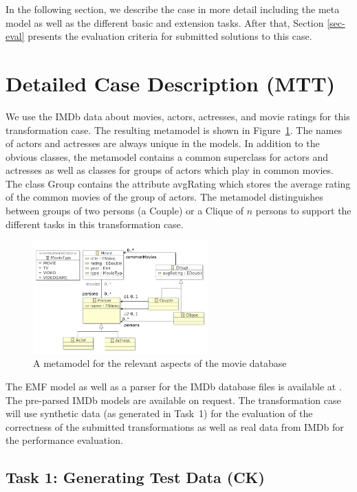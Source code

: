 \documentclass[a4paper,11pt]{article}
\newcommand{\p}[1]{\textsf{\small #1}}
\begin{document}
In the following section, we describe the case in more detail
including the meta model as well as the different basic and extension
tasks. After that, Section \ref{sec-eval} presents the evaluation
criteria for submitted solutions to this case.


\section{Detailed Case Description (MTT)}\label{sec-case}

We use the IMDb data about movies, actors, actresses, and movie ratings for
this transformation case. The resulting metamodel is shown in
Figure~\ref{fig:metamodel}.  The names of actors and actresses are always
unique in the models.  In addition to the obvious classes, the metamodel
contains a common superclass for actors and actresses as well as classes for
groups of actors which play in common movies. The class \p{Group} contains the
attribute \p{avgRating} which stores the average rating of the common movies of
the group of actors. The metamodel distinguishes between groups of two persons
(a \p{Couple}) or a \p{Clique} of $n$ persons to support the different tasks in
this transformation case.

\begin{figure}[ht]
\centering
\includegraphics[width=0.6\textwidth]{movies}
\caption{A metamodel for the relevant aspects of the movie database}
\label{fig:metamodel}
\end{figure}

The EMF model as well as a parser for the
IMDb database files is available at \cite{IMDB2EMF}. The pre-parsed
IMDb models are available on request. The transformation case will use
synthetic data (as generated in Task~1) for the evaluation of
the correctness of the submitted transformations as well as real data
from IMDb for the performance evaluation.


\subsection{Task 1: Generating Test Data (CK)}
\label{sec:gen-test-data}
\end{document}
